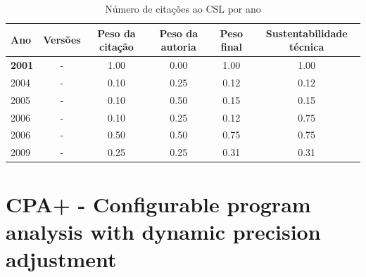 \begin{table}[H]
\caption{Número de citações ao CSL  por ano}
\centering
\begin{tabular}{| l | c | c | c | c | c |}
  \hline
  Ano & Versões & Peso da citação & Peso da autoria & Peso final & Sustentabilidade técnica \\
  \hline
            {\bf 2001}
          &
          -
          &
          1.00
          &
          0.00
          &
          1.00
          &
            {\color{blue} 1.00}
          \\
\hline
            2004
          &
          -
          &
          0.10
          &
          0.25
          &
          0.12
          &
            {\color{red} 0.12}
          \\
\hline
            2005
          &
          -
          &
          0.10
          &
          0.50
          &
          0.15
          &
            {\color{red} 0.15}
          \\
\hline
            2006
          &
          -
          &
          0.10
          &
          0.25
          &
          0.12
          &
            {\color{blue} 0.75}
          \\
            2006
          &
          -
          &
          0.50
          &
          0.50
          &
          0.75
          &
            {\color{blue} 0.75}
          \\
\hline
            2009
          &
          -
          &
          0.25
          &
          0.25
          &
          0.31
          &
            {\color{red} 0.31}
          \\
\hline
\end{tabular}
\end{table}



\section{CPA+ - Configurable program analysis with dynamic precision adjustment}


